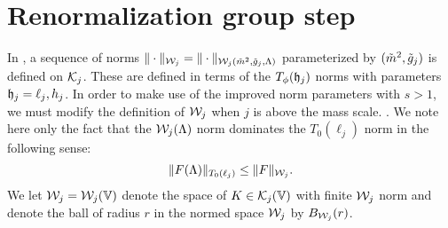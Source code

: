 

\section{Renormalization group step}
\label{sec:step}

In \cite[Section~\ref{step-sec:Knorms}]{BS-rg-step},
a sequence of norms $\|\cdot\|_{\mathcal{W}_j} = \|\cdot\|_{\mathcal{W}_j(\tilde{m}^2, \tilde{g}_j, \Lambda)}$
parameterized by $(\tilde{m}^2, \tilde{g}_j)$ is defined on $\mathcal{K}_j$.
These are defined in terms of the $T_\phi(\mathfrak{h}_j)$ norms with parameters $\mathfrak{h}_j = \ell_j, h_j$.
In order to make use of the improved norm parameters with $s > 1$,
we must modify the definition of $\mathcal{W}_j$ when $j$ is above the mass scale.
.
We note here only the fact that the $\mathcal{W}_j(\Lambda)$
norm dominates the $T_0(\ell_j)$ norm in the following sense:
\begin{equation}
\label{e:T0dom}
\|F(\Lambda)\|_{T_0(\ell_j)} \le \|F\|_{\mathcal{W}_j}.
\end{equation}
We let $\mathcal{W}_j = \mathcal{W}_j(\mathbb{V})$ denote the space of $K\in\mathcal{K}_j(\mathbb{V})$ with
finite $\mathcal{W}_j$ norm and
denote the ball of radius $r$ in the normed space $\mathcal{W}_j$ by $B_{\mathcal{W}_j}(r)$.

